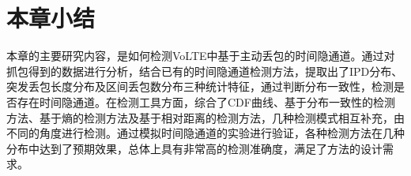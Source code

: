 \section{本章小结}
\label{chap:analyze:summary}

本章的主要研究内容，是如何检测VoLTE中基于主动丢包的时间隐通道。通过对抓包得到的数据进行分析，结合已有的时间隐通道检测方法，提取出了IPD分布、突发丢包长度分布及区间丢包数分布三种统计特征，通过判断分布一致性，检测是否存在时间隐通道。在检测工具方面，综合了CDF曲线、基于分布一致性的检测方法、基于熵的检测方法及基于相对距离的检测方法，几种检测模式相互补充，由不同的角度进行检测。通过模拟时间隐通道的实验进行验证，各种检测方法在几种分布中达到了预期效果，总体上具有非常高的检测准确度，满足了方法的设计需求。